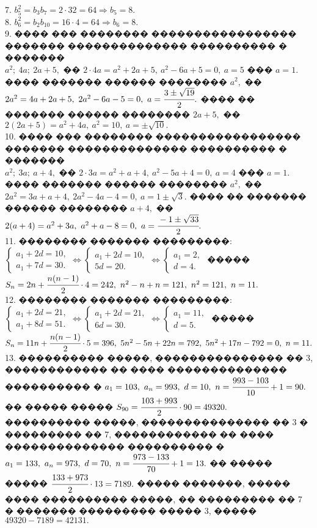 \documentclass[12pt]{article}
\begin{document}
7. $b_5^2=b_3b_7=2\cdot32=64\Rightarrow b_5=8.$\\
8. $b_6^2=b_2b_{10}=16\cdot4=64\Rightarrow b_6=8.$\\
9. ���� ��� �������� ����������������� ������� �������������� ���������� � �������\\ $a^2;\ 4a;\ 2a+5,$ �� $2\cdot4a=a^2+2a+5,\ a^2-6a+5=0,\ a=5$ ��� $a=1.$ ���� ������� ������ �������� $a^2,$ �� $2a^2=4a+2a+5,\ 2a^2-6a-5=0,\ a=\cfrac{3\pm\sqrt{19}}{2}.$ ���� �� ������� ������ �������� $2a+5,$ �� $2(2a+5)=a^2+4a,\ a^2=10,\ a=\pm\sqrt{10}.$\\
10. ���� ��� �������� ����������������� ������� �������������� ���������� � �������\\ $a^2;\ 3a;\ a+4,$ �� $2\cdot3a=a^2+a+4,\ a^2-5a+4=0,\ a=4$ ��� $a=1.$ ���� ������� ������ �������� $a^2,$ �� $2a^2=3a+a+4,\ 2a^2-4a-4=0,\ a=1\pm\sqrt{3}.$ ���� �� ������� ������ �������� $a+4,$ �� $2(a+4)=a^2+3a,\ a^2+a-8=0,\ a=\cfrac{-1\pm\sqrt{33}}{2}.$\\
11. �������� ������� ���������: $\begin{cases}a_1+2d=10,\\a_1+7d=30.\end{cases}\Leftrightarrow\begin{cases}a_1+2d=10,\\5d=20.\end{cases}
\Leftrightarrow\begin{cases}a_1=2,\\d=4.\end{cases}$ ����� $S_n=2n+\cfrac{n(n-1)}{2}\cdot4=242,\ n^2-n+n=121,\ n^2=121,\ n=11.$\\
12. �������� ������� ���������: $\begin{cases}a_1+2d=21,\\a_1+8d=51.\end{cases}\Leftrightarrow\begin{cases}a_1+2d=21,\\6d=30.\end{cases}
\Leftrightarrow\begin{cases}a_1=11,\\d=5.\end{cases}$ ����� $S_n=11n+\cfrac{n(n-1)}{2}\cdot5=396,\ 5n^2-5n+22n=792,\ 5n^2+17n-792=0,\ n=11.$\\
13. ���������� �����, ��������������� �� 3, ������������ �� ���� �������������� ���������� � $a_1=103,\ a_n=993,\ d=10,\ n=\cfrac{993-103}{10}+1=90.$ �� ����� ����� $S_{90}=\cfrac{103+993}{2}\cdot90=49320.$ ���������� �����, ��������������� �� 3 � ��������� �� 7, ������������ �� ���� �������������� ���������� � $a_1=133,\ a_n=973,\ d=70,\ n=\cfrac{973-133}{70}+1=13.$ �� ����� ����� $\cfrac{133+973}{2}\cdot13=7189.$ ����� �������, ����� ���� ���������� �����, �� ��������� �� 7 � ������� ��������� ����� 3, ����� $49320-7189=42131.$\\
\end{document}
